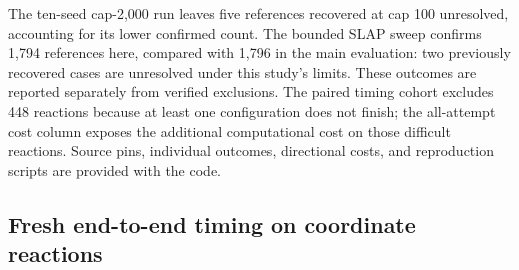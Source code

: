 The ten-seed cap-2,000 run leaves five references recovered at cap 100 unresolved, accounting for its lower confirmed count. The bounded SLAP sweep confirms 1,794 references here, compared with 1,796 in the main evaluation: two previously recovered cases are unresolved under this study's limits. These outcomes are reported separately from verified exclusions. The paired timing cohort excludes 448 reactions because at least one configuration does not finish; the all-attempt cost column exposes the additional computational cost on those difficult reactions. Source pins, individual outcomes, directional costs, and reproduction scripts are provided with the code.


\clearpage
\subsection{Fresh end-to-end timing on coordinate reactions}



\begin{table}[htbp]
\centering
\caption{\textbf{GRAFT search plus bond-event decoding.} CPU seconds per completed reaction in the fresh 140-reaction pass. The final row measures the whole pipeline; medians and percentiles of individual stages are not additive. Completion coverage and timing scope are stated above.}
\label{tab:end-to-end}

\end{table}
